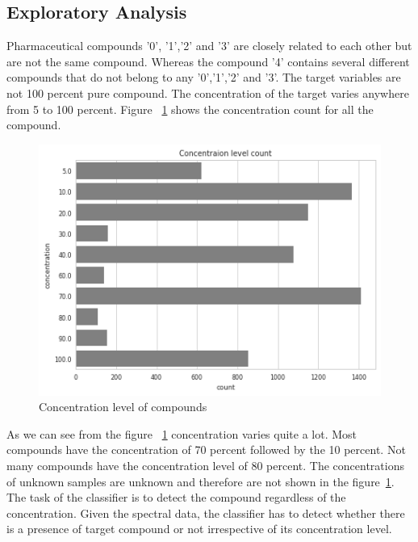 \subsection{Exploratory Analysis}
Pharmaceutical compounds '0', '1','2' and '3' are closely related to each other but are not the same compound. Whereas the compound '4' contains several different compounds that do not belong to any '0','1','2' and '3'. The target variables are not 100 percent pure compound. The concentration of the target varies anywhere from 5 to 100 percent. Figure ~\ref{fig:variable concentration} shows the concentration count for all the compound.

\begin{figure}[ht]
	\begin{center}
		\includegraphics[width=\textwidth]{images/variable_composition.png}
		\caption{Concentration level of compounds}
		\label{fig:variable concentration}
	\end{center}
\end{figure}

As we can see from the figure ~\ref{fig:variable concentration} concentration varies quite a lot. Most compounds have the concentration of 70 percent followed by the 10 percent. Not many compounds have the concentration level of 80 percent. The concentrations of unknown samples are unknown and therefore are not shown in the figure~\ref{fig:variable concentration}. The task of the classifier is to detect the compound regardless of the concentration. Given the spectral data, the classifier has to detect whether there is a presence of target compound or not irrespective of its concentration level. 


